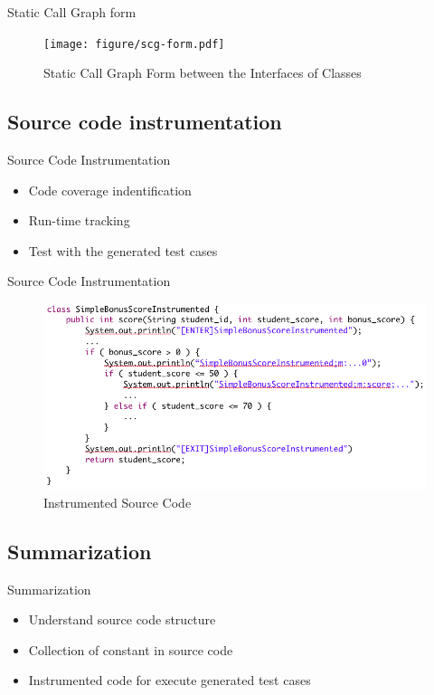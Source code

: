\documentclass{beamer}
\begin{document}
\begin{frame}{Static Call Graph form}
    \begin{figure}
        \texttt{[image: figure/scg-form.pdf]}
        \caption{Static Call Graph Form between the Interfaces of Classes}
        \label{fig:scgForm}
    \end{figure}
\end{frame}

\subsection{Source code instrumentation}
\begin{frame}{Source Code Instrumentation}
    \begin{itemize}
        \item Code coverage indentification
        \item Run-time tracking
        \item Test with the generated test cases 
    \end{itemize}
\end{frame}

\begin{frame}{Source Code Instrumentation}
    \begin{figure}
        \includegraphics[width=.8\paperwidth]{figure/instrumented-code.png}
        \caption{Instrumented Source Code}
        \label{fig:instrumentedSourceCode}
    \end{figure}
\end{frame}

\subsection{Summarization}
\begin{frame}{Summarization}
    \begin{itemize}
        \item Understand source code structure
        \item Collection of constant in source code
        \item Instrumented code for execute generated test cases
    \end{itemize}
\end{frame}
\end{document}
